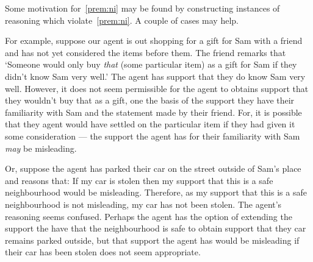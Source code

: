 \documentclass[10pt]{article}
\begin{document}
\begin{note}
  Some motivation for~\ref{prem:ni} may be found by constructing instances of reasoning which violate~\ref{prem:ni}.
  A couple of cases may help.

  For example, suppose our agent is out shopping for a gift for Sam with a friend and has not yet considered the items before them.
  The friend remarks that `Someone would only buy \emph{that} (some particular item) as a gift for Sam if they didn't know Sam very well.'
  The agent has support that they do know Sam very well.
  However, it does not seem permissible for the agent to obtains support that they wouldn't buy that as a gift, one the basis of the support they have their familiarity with Sam and the statement made by their friend.
  For, it is possible that they agent would have settled on the particular item if they had given it some consideration --- the support the agent has for their familiarity with Sam \emph{may} be misleading.

  Or, suppose the agent has parked their car on the street outside of Sam's place and reasons that:
  If my car is stolen then my support that this is a safe neighbourhood would be misleading.
  Therefore, as my support that this is a safe neighbourhood is not misleading, my car has not been stolen.
  The agent's reasoning seems confused.
  Perhaps the agent has the option of extending the support the have that the neighbourhood is safe to obtain support that they car remains parked outside, but that support the agent has would be misleading if their car has been stolen does not seem appropriate.
\end{note}
\end{document}
